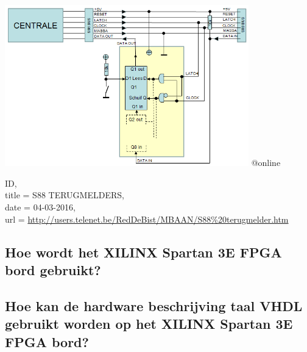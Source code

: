 \includegraphics[width=400px]{./img/S88Bus.png}
@online{ID,\\
	title = {S88 TERUGMELDERS},\\
	date = {04-03-2016},\\
	url = \url{http://users.telenet.be/RedDeBist/MBAAN/S88\%20terugmelder.htm}
		
	}
\clearpage
	
\subsection{Hoe wordt het XILINX Spartan 3E FPGA bord gebruikt?}

\newpage
\subsection{Hoe kan de hardware beschrijving taal VHDL gebruikt worden op het XILINX Spartan 3E FPGA bord?}

